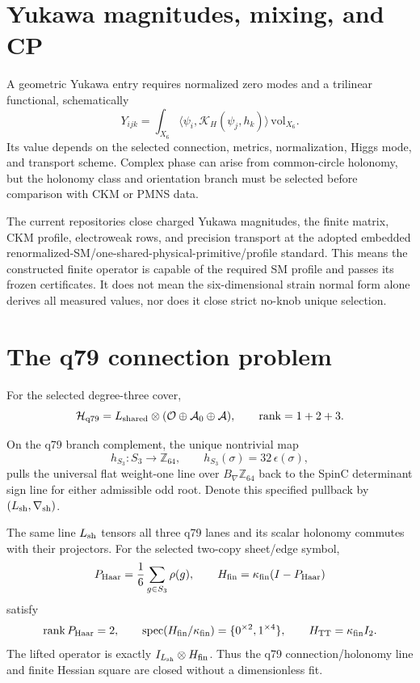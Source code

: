 \documentclass[11pt]{article}
\begin{document}
\section{Yukawa magnitudes, mixing, and CP}

A geometric Yukawa entry requires normalized zero modes and a trilinear
functional, schematically
\[
 Y_{ijk}=\int_{X_6}
 \langle\psi_i,\mathcal K_H(\psi_j,h_k)\rangle\,\mathrm{vol}_{X_6}.
\]
Its value depends on the selected connection, metrics, normalization, Higgs
mode, and transport scheme.  Complex phase can arise from common-circle
holonomy, but the holonomy class and orientation branch must be selected
before comparison with CKM or PMNS data.

The current repositories close charged Yukawa magnitudes, the finite matrix,
CKM profile, electroweak rows, and precision transport at the adopted embedded
renormalized-SM/one-shared-physical-primitive/profile standard.  This means the
constructed finite operator is capable of the required SM profile and passes
its frozen certificates.  It does not mean the six-dimensional strain normal
form alone derives all measured values, nor does it close strict no-knob unique
selection.

\section{The q79 connection problem}

For the selected degree-three cover,
\[
 \mathcal H_{\rm q79}
 =L_{\rm shared}\otimes
 (\mathcal O\oplus\mathcal A_0\oplus\mathcal A),
 \qquad \operatorname{rank}=1+2+3.
\]

On the q79 branch complement, the unique nontrivial map
\[
 h_{S_3}:S_3\to\mathbb Z_{64},
 \qquad h_{S_3}(\sigma)=32\,\epsilon(\sigma),
\]
pulls the universal flat weight-one line over
$B_\nabla\mathbb Z_{64}$ back to the SpinC determinant sign line for either
admissible odd root. Denote this specified pullback by
$(L_{\rm sh},\nabla_{\rm sh})$.

\begin{theorem}
The same line $L_{\rm sh}$ tensors all three q79 lanes and its scalar holonomy
commutes with their projectors. For the selected two-copy sheet/edge symbol,
\[
 P_{\rm Haar}=\frac1{6}\sum_{g\in S_3}\rho(g),
 \qquad
 H_{\rm fin}=\kappa_{\rm fin}(I-P_{\rm Haar})
\]
satisfy
\[
 \operatorname{rank}P_{\rm Haar}=2,
 \qquad
 \operatorname{spec}(H_{\rm fin}/\kappa_{\rm fin})
 =\{0^{\times2},1^{\times4}\},
 \qquad H_{\rm TT}=\kappa_{\rm fin}I_2.
\]
The lifted operator is exactly
$I_{L_{\rm sh}}\otimes H_{\rm fin}$. Thus the q79 connection/holonomy line and
finite Hessian square are closed without a dimensionless fit.
\end{theorem}
\end{document}
